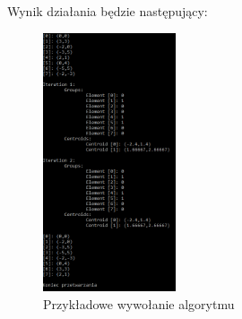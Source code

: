 Wynik działania będzie następujący:

\begin{figure}[h]
	\centering
	\includegraphics[width=0.35\textwidth]{./img/example.png}
	\caption{Przykładowe wywołanie algorytmu}
	\label{img:example}
\end{figure}